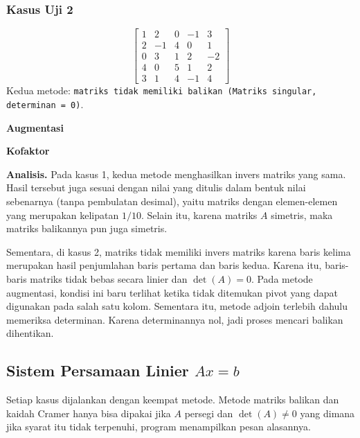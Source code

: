 \subsubsection{Kasus Uji 2}
\begin{kasus}
\[
\begin{bmatrix}
1 & 2 & 0 & -1 & 3 \\
2 & -1 & 4 & 0 & 1 \\
0 & 3 & 1 & 2 & -2 \\
4 & 0 & 5 & 1 & 2 \\
3 & 1 & 4 & -1 & 4
\end{bmatrix}
\]
Kedua metode: \texttt{matriks tidak memiliki balikan (Matriks singular, determinan = 0)}.

\textbf{Augmentasi}

\textbf{Kofaktor}
\end{kasus}

\textbf{Analisis.} Pada kasus 1, kedua metode menghasilkan invers matriks yang sama. Hasil tersebut juga sesuai dengan nilai yang ditulis dalam bentuk nilai sebenarnya (tanpa pembulatan desimal), yaitu matriks dengan elemen-elemen yang merupakan kelipatan $1/10$. Selain itu, karena matriks $A$ simetris, maka matriks balikannya pun juga simetris.

Sementara, di kasus 2, matriks tidak memiliki invers matriks karena baris kelima merupakan hasil penjumlahan baris pertama dan baris kedua. Karena itu, baris-baris matriks tidak bebas secara linier dan $\det(A) = 0$. Pada metode augmentasi, kondisi ini baru terlihat ketika tidak ditemukan pivot yang dapat digunakan pada salah satu kolom. Sementara itu, metode adjoin terlebih dahulu memeriksa determinan. Karena determinannya nol, jadi proses mencari balikan dihentikan.

\subsection{Sistem Persamaan Linier $Ax = b$}

Setiap kasus dijalankan dengan keempat metode. Metode matriks balikan dan kaidah Cramer hanya bisa dipakai jika $A$ persegi dan $\det(A) \neq 0$ yang dimana jika syarat itu tidak terpenuhi, program menampilkan pesan alasannya.

